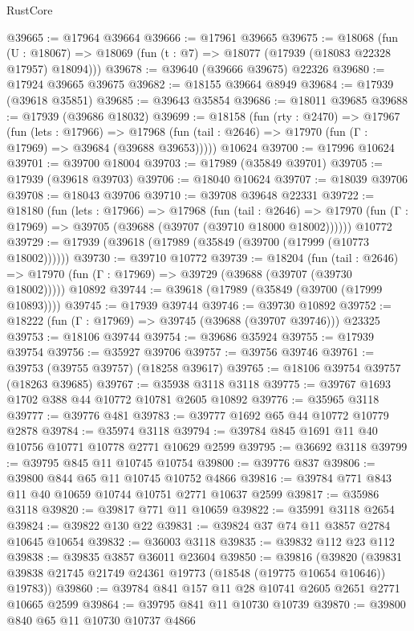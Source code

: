 \begin{lexlean}{RustCore}
\begin{coremodule}
@39665 := @17964 @39664
@39666 := @17961 @39665
@39675 := @18068
    (fun (U : @18067) => @18069 (fun (t : @7) => @18077 (@17939 (@18083 @22328 @17957) @18094)))
@39678 := @39640 (@39666 @39675) @22326
@39680 := @17924 @39665 @39675
@39682 := @18155 @39664 @8949
@39684 := @17939 (@39618 @35851)
@39685 := @39643 @35854
@39686 := @18011 @39685
@39688 := @17939 (@39686 @18032)
@39699 := @18158
    (fun (rty : @2470) =>
    @17967
      (fun (lets : @17966) =>
      @17968 (fun (tail : @2646) => @17970 (fun (Γ : @17969) => @39684 (@39688 @39653)))))
    @10624
@39700 := @17996 @10624
@39701 := @39700 @18004
@39703 := @17989 (@35849 @39701)
@39705 := @17939 (@39618 @39703)
@39706 := @18040 @10624
@39707 := @18039 @39706
@39708 := @18043 @39706
@39710 := @39708 @39648 @22331
@39722 := @18180
    (fun (lets : @17966) =>
    @17968
      (fun (tail : @2646) =>
      @17970 (fun (Γ : @17969) => @39705 (@39688 (@39707 (@39710 @18000 @18002))))))
    @10772
@39729 := @17939 (@39618 (@17989 (@35849 (@39700 (@17999 (@10773 @18002))))))
@39730 := @39710 @10772
@39739 := @18204
    (fun (tail : @2646) => @17970 (fun (Γ : @17969) => @39729 (@39688 (@39707 (@39730 @18002)))))
    @10892
@39744 := @39618 (@17989 (@35849 (@39700 (@17999 @10893))))
@39745 := @17939 @39744
@39746 := @39730 @10892
@39752 := @18222 (fun (Γ : @17969) => @39745 (@39688 (@39707 @39746))) @23325
@39753 := @18106 @39744
@39754 := @39686 @35924
@39755 := @17939 @39754
@39756 := @35927 @39706
@39757 := @39756 @39746
@39761 := @39753 (@39755 @39757) (@18258 @39617)
@39765 := @18106 @39754 @39757 (@18263 @39685)
@39767 := @35938 @3118 @3118
@39775 := @39767 @1693 @1702 @388 @44 @10772 @10781 @2605 @10892
@39776 := @35965 @3118
@39777 := @39776 @481
@39783 := @39777 @1692 @65 @44 @10772 @10779 @2878
@39784 := @35974 @3118
@39794 := @39784 @845 @1691 @11 @40 @10756 @10771 @10778 @2771 @10629 @2599
@39795 := @36692 @3118
@39799 := @39795 @845 @11 @10745 @10754
@39800 := @39776 @837
@39806 := @39800 @844 @65 @11 @10745 @10752 @4866
@39816 := @39784 @771 @843 @11 @40 @10659 @10744 @10751 @2771 @10637 @2599
@39817 := @35986 @3118
@39820 := @39817 @771 @11 @10659
@39822 := @35991 @3118 @2654
@39824 := @39822 @130 @22
@39831 := @39824 @37 @74 @11 @3857 @2784 @10645 @10654
@39832 := @36003 @3118
@39835 := @39832 @112 @23 @112
@39838 := @39835 @3857 @36011 @23604
@39850 := @39816
    (@39820 (@39831 @39838 @21745 @21749 @24361 @19773 (@18548 (@19775 @10654 @10646)) @19783))
@39860 := @39784 @841 @157 @11 @28 @10741 @2605 @2651 @2771 @10665 @2599
@39864 := @39795 @841 @11 @10730 @10739
@39870 := @39800 @840 @65 @11 @10730 @10737 @4866

\end{coremodule}
\end{lexlean}

